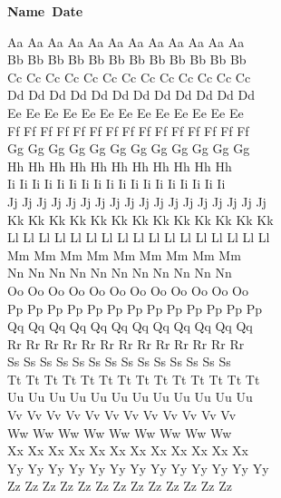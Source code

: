 \documentclass[12pt, landscape, letterpaper]{article}
\newcommand{\lowercaseheight}{1.7ex}
\newcommand{\uppercaseheight}{3.1ex}
\newcommand{\descenderdepth}{-0.8ex}
\newenvironment{drillsheet}{%
    \setlength\linenumbersep{0pt}%
    \renewcommand{\thelinenumber}{%
        \begin{tikzpicture}[overlay]
                \draw (0,0) -- ++(\textwidth,0);
                \draw [dotted] (0,\lowercaseheight) -- ++(\textwidth,0);
                \draw (0,\uppercaseheight) -- ++(\textwidth,0);
                \draw [ultra thin] (0,\descenderdepth) -- ++(\textwidth,0);
        \end{tikzpicture}%
    }%
    \renewcommand\linenumberfont{\normalfont\color{black}}
    \begin{linenumbers}%
        \color{black!50}%
}{
    \end{linenumbers}%
}
\begin{document}
{\bf Name\ \underline{\hskip 200pt}\hskip 200pt}{\bf Date\
\underline{\hskip 200pt}}\\

\Huge
\begin{drillsheet}
    {\fontsize{40}{50} \selectfont Aa Aa Aa Aa Aa Aa Aa Aa Aa Aa Aa Aa}\\
    {\fontsize{40}{50} \selectfont Bb Bb Bb Bb Bb Bb Bb Bb Bb Bb Bb Bb}\\
    {\fontsize{40}{50} \selectfont Cc Cc Cc Cc Cc Cc Cc Cc Cc Cc Cc Cc Cc}\\
    {\fontsize{40}{50} \selectfont Dd Dd Dd Dd Dd Dd Dd Dd Dd Dd Dd Dd}\\
    {\fontsize{40}{50} \selectfont Ee Ee Ee Ee Ee Ee Ee Ee Ee Ee Ee Ee Ee}\\
    {\fontsize{40}{50} \selectfont Ff Ff Ff Ff Ff Ff Ff Ff Ff Ff Ff Ff Ff Ff Ff}\\
    {\fontsize{40}{50} \selectfont Gg Gg Gg Gg Gg Gg Gg Gg Gg Gg Gg Gg}\\
    {\fontsize{40}{50} \selectfont Hh Hh Hh Hh Hh Hh Hh Hh Hh Hh Hh}\\
    {\fontsize{40}{50} \selectfont Ii Ii Ii Ii Ii Ii Ii Ii Ii Ii Ii Ii Ii Ii Ii Ii Ii Ii}\\
    {\fontsize{40}{50} \selectfont Jj Jj Jj Jj Jj Jj Jj Jj Jj Jj Jj Jj Jj Jj Jj Jj Jj Jj}\\
    {\fontsize{40}{50} \selectfont Kk Kk Kk Kk Kk Kk Kk Kk Kk Kk Kk Kk Kk}\\
    {\fontsize{40}{50} \selectfont Ll Ll Ll Ll Ll Ll Ll Ll Ll Ll Ll Ll Ll Ll Ll Ll Ll}\\
    {\fontsize{40}{50} \selectfont Mm Mm Mm Mm Mm Mm Mm Mm Mm}\\
    {\fontsize{40}{50} \selectfont Nn Nn Nn Nn Nn Nn Nn Nn Nn Nn Nn}\\
    {\fontsize{40}{50} \selectfont Oo Oo Oo Oo Oo Oo Oo Oo Oo Oo Oo Oo}\\
    {\fontsize{40}{50} \selectfont Pp Pp Pp Pp Pp Pp Pp Pp Pp Pp Pp Pp Pp}\\
    {\fontsize{40}{50} \selectfont Qq Qq Qq Qq Qq Qq Qq Qq Qq Qq Qq Qq}\\
    {\fontsize{40}{50} \selectfont Rr Rr Rr Rr Rr Rr Rr Rr Rr Rr Rr Rr Rr}\\
    {\fontsize{40}{50} \selectfont Ss Ss Ss Ss Ss Ss Ss Ss Ss Ss Ss Ss Ss Ss}\\
    {\fontsize{40}{50} \selectfont Tt Tt Tt Tt Tt Tt Tt Tt Tt Tt Tt Tt Tt Tt}\\
    {\fontsize{40}{50} \selectfont Uu Uu Uu Uu Uu Uu Uu Uu Uu Uu Uu Uu}\\
    {\fontsize{40}{50} \selectfont Vv Vv Vv Vv Vv Vv Vv Vv Vv Vv Vv Vv}\\
    {\fontsize{40}{50} \selectfont Ww Ww Ww Ww Ww Ww Ww Ww Ww}\\
    {\fontsize{40}{50} \selectfont Xx Xx Xx Xx Xx Xx Xx Xx Xx Xx Xx Xx}\\
    {\fontsize{40}{50} \selectfont Yy Yy Yy Yy Yy Yy Yy Yy Yy Yy Yy Yy Yy}\\
    {\fontsize{40}{50} \selectfont Zz Zz Zz Zz Zz Zz Zz Zz Zz Zz Zz Zz Zz}   
\end{drillsheet}
\end{document}
